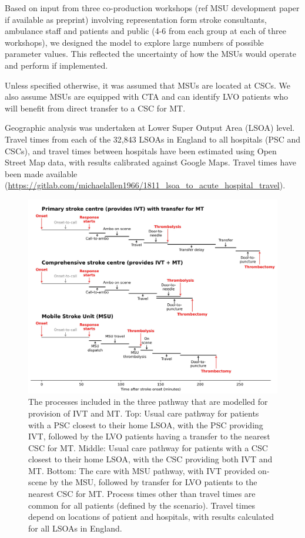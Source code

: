 Based on input from three co-production workshops (ref MSU development paper if available as preprint) involving representation form stroke consultants, ambulance staff and patients and public (4-6 from each group at each of three workshops), we designed the model to explore large numbers of possible parameter values. This reflected the uncertainty of how the MSUs would operate and perform if implemented.

Unless specified otherwise, it was assumed that MSUs are located at CSCs. We also assume MSUs are equipped with CTA and can identify LVO patients who will benefit from direct transfer to a CSC for MT.

Geographic analysis was undertaken at Lower Super Output Area (LSOA) level. Travel times from each of the 32,843 LSOAs in England to all hospitals (PSC and CSCs), and travel times between hospitals have been estimated using Open Street Map data, with results calibrated against Google Maps. Travel times have been made available (\url{https://gitlab.com/michaelallen1966/1811_lsoa_to_acute_hospital_travel}).

\begin{figure}[h]
    \centering
    \includegraphics[width=0.85\linewidth]{images/stroke_treatment.jpg}
    \caption{The processes included in the three pathway that are modelled for provision of IVT and MT. Top: Usual care pathway for patients with a PSC closest to their home LSOA, with the PSC providing IVT, followed by the LVO patients having a transfer to the nearest CSC for MT. Middle: Usual care pathway for patients with a CSC closest to their home LSOA, with the CSC providing both IVT and MT. Bottom: The care with MSU pathway, with IVT provided on-scene by the MSU, followed by transfer for LVO patients to the nearest CSC for MT. Process times other than travel times are common for all patients (defined by the scenario). Travel times depend on locations of patient and hospitals, with results calculated for all LSOAs in England.}
    \label{fig:process}
\end{figure}


